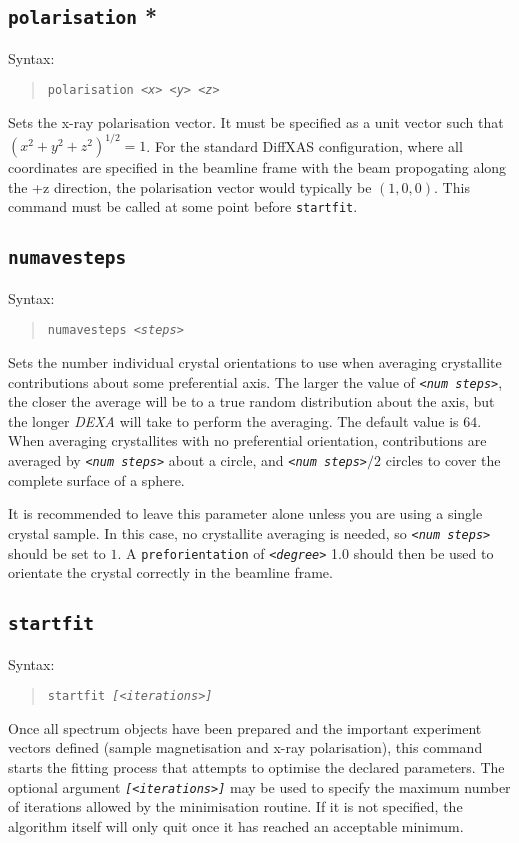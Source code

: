 \documentclass[a4paper,12pt]{report}
\newcommand{\dexa}{\emph{DEXA} }
\begin{document}
\subsection{\texttt{polarisation} *}
Syntax:
\begin{quote}
  \texttt{polarisation \emph{<x> <y> <z>}}
\end{quote}
Sets the x-ray polarisation vector. It must be specified as a unit vector such that $(x^2 + y^2 + z^2)^{1/2} = 1$. For the standard DiffXAS configuration, where all coordinates are specified in the beamline frame with the beam propogating along the +z direction, the polarisation vector would typically be $(1, 0, 0)$. This command must be called at some point before \verb|startfit|.

\subsection{\texttt{numavesteps}}
Syntax:
\begin{quote}
  \texttt{numavesteps \emph{<steps>}}
\end{quote}
Sets the number individual crystal orientations to use when averaging crystallite contributions about some preferential axis. The larger the value of \texttt{\emph{<num steps>}}, the closer the average will be to a true random distribution about the axis, but the longer \dexa will take to perform the averaging. The default value is $64$. When averaging crystallites with no preferential orientation, contributions are averaged by \texttt{\emph{<num steps>}} about a circle, and \texttt{\emph{<num steps>}}$/2$ circles to cover the complete surface of a sphere.

It is recommended to leave this parameter alone unless you are using a single crystal sample. In this case, no crystallite averaging is needed, so \texttt{\emph{<num steps>}} should be set to $1$. A \verb|preforientation| of \texttt{\emph{<degree>}} 1.0 should then be used to orientate the crystal correctly in the beamline frame.

\subsection{\texttt{startfit}}
Syntax:
\begin{quote}
  \texttt{startfit \emph{[<iterations>]}}
\end{quote}
Once all spectrum objects have been prepared and the important experiment vectors defined (sample magnetisation and x-ray polarisation), this command starts the fitting process that attempts to optimise the declared parameters. The optional argument \texttt{\emph{[<iterations>]}} may be used to specify the maximum number of iterations allowed by the minimisation routine. If it is not specified, the algorithm itself will only quit once it has reached an acceptable minimum.
\end{document}
